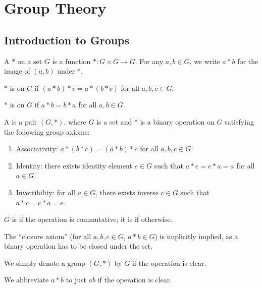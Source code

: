 \chapter{Group Theory}\label{chap:group-theory}
\section{Introduction to Groups}
\begin{definition}
A  $\ast$ on a set $G$ is a function $\ast:G\times G\to G$. For any $a,b\in G$, we write $a \ast b$ for the image of $(a,b)$ under $\ast$.

$\ast$ is  on $G$ if $(a\ast b)\ast c=a\ast(b\ast c)$ for all $a,b,c\in G$.

$\ast$ is  on $G$ if $a\ast b=b\ast a$ for all $a,b\in G$.
\end{definition}

\begin{definition}[Group]
A  is a pair $(G,\ast)$, where $G$ is a set and $\ast$ is a binary operation on $G$ satisfying the following group axioms:
\begin{enumerate}[label=(\roman*)]
\item Associativity: $a\ast(b\ast c)=(a\ast b)\ast c$ for all $a,b,c\in G$.
\item Identity: there exists identity element $e\in G$ such that $a\ast e=e\ast a=a$ for all $a\in G$.
\item Invertibility: for all $a\in G$, there exists inverse $c\in G$ such that $a\ast c=c\ast a=e$.
\end{enumerate}

$G$ is  if the operation is commutative; it is  if otherwise.
\end{definition}

\begin{remark}
The ``closure axiom'' (for all $a,b,c \in G$, $a\ast b\in G$) is implicitly implied, as a binary operation has to be closed under the set.
\end{remark}

\begin{notation}
We simply denote a group $(G,\ast)$ by $G$ if the operation is clear.
\end{notation}

\begin{notation}
We abbreviate $a\ast b$ to just $ab$ if the operation is clear.
\end{notation}


